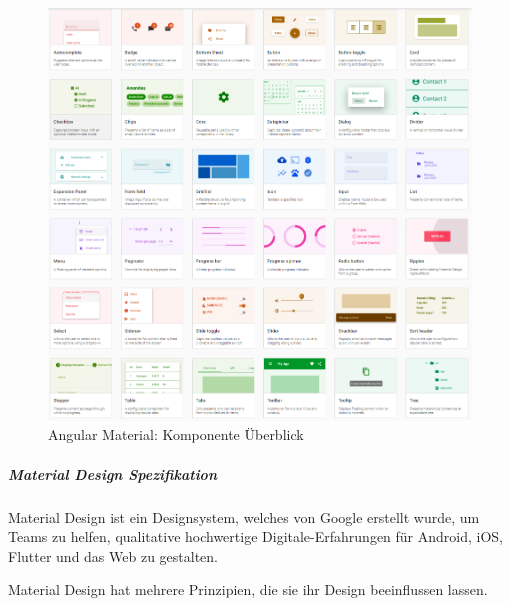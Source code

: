 \begin{figure}
    \centering
    \includegraphics[scale=0.5]{pics/AngularMaterialsComponentsOverview.png}
    \caption{Angular Material: Komponente Überblick \cite{AngularComponents}}
    \label{fig:impl:angular-material-overview-components}
\end{figure}

\subparagraph{Material Design Spezifikation}
Material Design ist ein Designsystem, welches von Google erstellt wurde, um Teams zu helfen, qualitative hochwertige Digitale-Erfahrungen für Android, iOS, Flutter und das Web zu gestalten.

Material Design hat mehrere Prinzipien, die sie ihr Design beeinflussen lassen.

